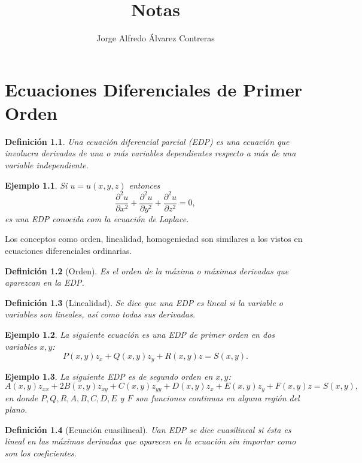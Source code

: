 \documentclass[11pt,letterpaper,draft]{report}
\title{Notas}
\author{Jorge Alfredo Álvarez Contreras}
\newtheorem{defn}{Definición}
\newtheorem{example}{Ejemplo}[section]
\newcommand\<{\langle}
\renewcommand\>{\rangle}
\begin{document}
\maketitle

\tableofcontents

\chapter{Ecuaciones Diferenciales de Primer Orden}

\begin{defn}
  Una ecuación diferencial parcial (EDP) es una ecuación 
  que involucra derivadas de una o más variables dependientes 
  respecto a más de una variable independiente.
\end{defn}

\begin{example}
  Si $u = u(x,y,z)$ entonces
  \[
  \frac{\partial^2 u}{\partial x^2} + \frac{\partial^2 u}{\partial y^2} + \frac{\partial^2 u}{\partial z^2} = 0,
  \] es una EDP conocida com la ecuación de Laplace.
\end{example}

Los conceptos como orden, linealidad, homogeniedad son
similares a los vistos en ecuaciones diferenciales
ordinarias.

\begin{defn}[Orden]
  Es el orden de la máxima o máximas derivadas que aparezcan
  en la EDP.
\end{defn}

\begin{defn}[Linealidad]
  Se dice que una EDP es lineal si la variable o variables
  son \textit{lineales}, así como \textit{todas} sus
  derivadas.
\end{defn}

\begin{example}
  La siguiente ecuación es una EDP de primer orden en dos
  variables $x,y$:
  \[
    P(x,y) z_x + Q(x,y) z_y + R(x,y) z = S(x,y).
  \] 
\end{example}

\begin{example}
  La siguiente EDP es de segundo orden en $x,y$:
  \[
    A(x,y) z_{xx} + 2B(x,y) z_{xy} + C(x,y) z_{yy} + D(x,y)
    z_x + E(x,y) z_y + F(x,y) z = S(x,y),
  \] en donde $P,Q,R,A,B,C,D,E$ y $F$ son funciones
  continuas en alguna región del plano.
\end{example}

\begin{defn}[Ecuación cuasilineal]
  Uan EDP se dice cuasilineal si ésta es lineal en las
  máximas derivadas que aparecen en la ecuación sin importar
  como son los coeficientes.
\end{defn}
\end{document}
